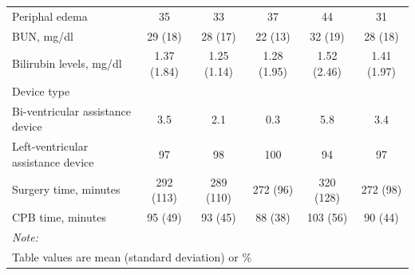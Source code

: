 \documentclass{article}
\begin{document}
\begin{table}
\begin{tabular}{lccccc}
Periphal edema & 35 & 33 & 37 & 44 & 31\\
BUN, mg/dl & 29 (18) & 28 (17) & 22 (13) & 32 (19) & 28 (18)\\
\addlinespace
Bilirubin levels, mg/dl & 1.37 (1.84) & 1.25 (1.14) & 1.28 (1.95) & 1.52 (2.46) & 1.41 (1.97)\\
Device type &  &  &  &  & \\
\hspace{1em}Bi-ventricular assistance device & 3.5 & 2.1 & 0.3 & 5.8 & 3.4\\
\hspace{1em}Left-ventricular assistance device & 97 & 98 & 100 & 94 & 97\\
Surgery time, minutes & 292 (113) & 289 (110) & 272 (96) & 320 (128) & 272 (98)\\
\addlinespace
CPB time, minutes & 95 (49) & 93 (45) & 88 (38) & 103 (56) & 90 (44)\\
\bottomrule
\multicolumn{6}{l}{\rule{0pt}{1em}\textit{Note: }}\\
\multicolumn{6}{l}{\rule{0pt}{1em}Table values are mean (standard deviation) or \%}\\
\end{tabular}

\end{table}

\clearpage
\end{document}

